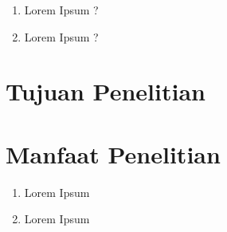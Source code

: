 \documentclass[12pt,oneside]{udthesis}
\begin{document}
\begin{enumerate}
    \item  Lorem Ipsum ?
    \item Lorem Ipsum ?
\end{enumerate}


\section{Tujuan Penelitian}
\lipsum[2-4]
\section{Manfaat Penelitian}

\lipsum[2-4]
\begin{enumerate}
\item Lorem Ipsum
\item Lorem Ipsum
\end{enumerate}
\end{document}
